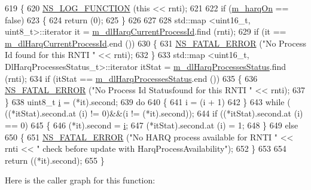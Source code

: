 \begin{DoxyCode}
619 \{
620   \hyperlink{log-macros-disabled_8h_a90b90d5bad1f39cb1b64923ea94c0761}{NS\_LOG\_FUNCTION} (\textcolor{keyword}{this} << rnti);
621 
622   \textcolor{keywordflow}{if} (\hyperlink{classns3_1_1TdTbfqFfMacScheduler_afbd88f1e039b365dcdbb076e99ce5506}{m\_harqOn} == \textcolor{keyword}{false})
623     \{
624       \textcolor{keywordflow}{return} (0);
625     \}
626 
627 
628   std::map <uint16\_t, uint8\_t>::iterator it = \hyperlink{classns3_1_1TdTbfqFfMacScheduler_ad1c507f0824369e326a2f4594a19f5e9}{m\_dlHarqCurrentProcessId}.find (rnti);
629   \textcolor{keywordflow}{if} (it == \hyperlink{classns3_1_1TdTbfqFfMacScheduler_ad1c507f0824369e326a2f4594a19f5e9}{m\_dlHarqCurrentProcessId}.end ())
630     \{
631       \hyperlink{group__fatal_ga5131d5e3f75d7d4cbfd706ac456fdc85}{NS\_FATAL\_ERROR} (\textcolor{stringliteral}{"No Process Id found for this RNTI "} << rnti);
632     \}
633   std::map <uint16\_t, DlHarqProcessesStatus\_t>::iterator itStat = 
      \hyperlink{classns3_1_1TdTbfqFfMacScheduler_a3d25806fc0b4360d668951f3a6b96b8d}{m\_dlHarqProcessesStatus}.find (rnti);
634   \textcolor{keywordflow}{if} (itStat == \hyperlink{classns3_1_1TdTbfqFfMacScheduler_a3d25806fc0b4360d668951f3a6b96b8d}{m\_dlHarqProcessesStatus}.end ())
635     \{
636       \hyperlink{group__fatal_ga5131d5e3f75d7d4cbfd706ac456fdc85}{NS\_FATAL\_ERROR} (\textcolor{stringliteral}{"No Process Id Statusfound for this RNTI "} << rnti);
637     \}
638   uint8\_t \hyperlink{bernuolliDistribution_8m_a6f6ccfcf58b31cb6412107d9d5281426}{i} = (*it).second;
639   \textcolor{keywordflow}{do}
640     \{
641       i = (i + 1) %
642     \}
643   \textcolor{keywordflow}{while} ( ((*itStat).second.at (i) != 0)&&(i != (*it).second));
644   \textcolor{keywordflow}{if} ((*itStat).second.at (i) == 0)
645     \{
646       (*it).second = \hyperlink{bernuolliDistribution_8m_a6f6ccfcf58b31cb6412107d9d5281426}{i};
647       (*itStat).second.at (i) = 1;
648     \}
649   \textcolor{keywordflow}{else}
650     \{
651       \hyperlink{group__fatal_ga5131d5e3f75d7d4cbfd706ac456fdc85}{NS\_FATAL\_ERROR} (\textcolor{stringliteral}{"No HARQ process available for RNTI "} << rnti << \textcolor{stringliteral}{" check before update
       with HarqProcessAvailability"});
652     \}
653 
654   \textcolor{keywordflow}{return} ((*it).second);
655 \}
\end{DoxyCode}


Here is the caller graph for this function\+:



